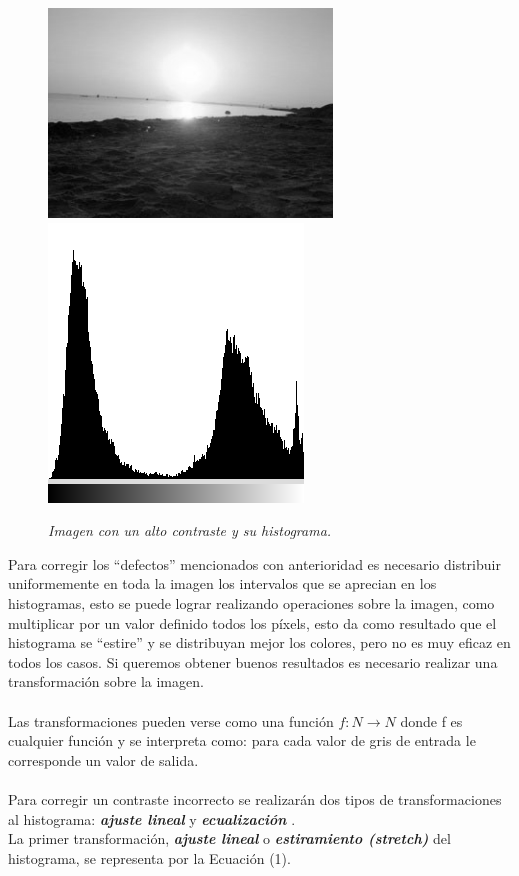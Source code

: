 \documentclass[conference]{IEEEtran}
\begin{document}
\begin{figure}[h]
	\begin{center}
		\setlength{\unitlength}{0.00105in}
		\includegraphics[scale=0.57]{./images/playa.png}
		\includegraphics[scale=0.466]{./images/figure2_2.png}
	\end{center}
	\caption{\emph{ Imagen con un alto contraste y su histograma.}}
\end{figure}

Para corregir los ``defectos'' mencionados con anterioridad es necesario distribuir uniformemente en toda la imagen los intervalos que se aprecian en los histogramas, esto se puede lograr realizando operaciones sobre la imagen, como multiplicar por un valor definido todos los p\'ixels, esto da como resultado que el histograma se ``estire'' y se distribuyan mejor los colores, pero no es muy eficaz en todos los casos. Si queremos obtener buenos resultados es necesario realizar una transformaci\'on sobre la imagen.\\\\
Las transformaciones pueden verse como una funci\'on $f: N \rightarrow N$ donde f es cualquier funci\'on y se interpreta como: para cada valor de gris de entrada le corresponde un valor de salida.\\\\
Para corregir un contraste incorrecto se realizar\'an dos tipos de transformaciones al histograma: \textbf{\emph{ajuste lineal}} y \textbf{\emph{ecualizaci\'on}} .\\ La primer transformaci\'on, \textbf{\emph{ajuste lineal}} o \textbf{\emph{estiramiento (stretch)}} del histograma, se representa por la Ecuaci\'on (1).\\
\end{document}
